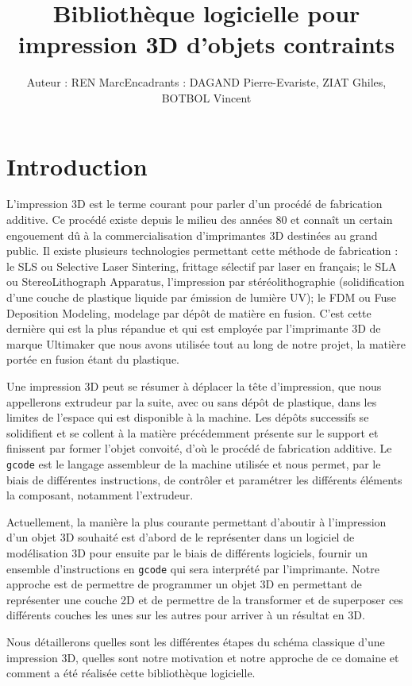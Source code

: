 \documentclass[11pt, titlepage]{article}
\author{Auteur : REN Marc\newline Encadrants : DAGAND Pierre-Evariste, ZIAT Ghiles, BOTBOL Vincent}
\title{Bibliothèque logicielle pour impression 3D d’objets contraints}
\begin{document}
\maketitle
\newpage
\newpage
\tableofcontents
\newpage
\section{Introduction}
L'impression 3D est le terme courant pour parler d'un procédé de fabrication additive. Ce procédé existe depuis le milieu des années 80 et connaît un certain engouement dû à la commercialisation d'imprimantes 3D destinées au grand public.
Il existe plusieurs technologies permettant cette méthode de fabrication :
le SLS ou Selective Laser Sintering, frittage sélectif par laser en français;
le SLA ou StereoLithograph Apparatus, l'impression par stéréolithographie (solidification d'une couche de plastique liquide par émission de lumière UV);
le FDM ou Fuse Deposition Modeling, modelage par dépôt de matière en fusion.
C'est cette dernière qui est la plus répandue et qui est employée par l'imprimante 3D de marque Ultimaker que nous avons utilisée tout au long de notre projet, la matière portée en fusion étant du plastique.

Une impression 3D peut se résumer à déplacer la tête d'impression, que nous appellerons extrudeur par la suite, avec ou sans dépôt de plastique, dans les limites de l'espace qui est disponible à la machine. Les dépôts successifs se solidifient et se collent à la matière précédemment présente sur le support et finissent par former l'objet convoité, d'où le procédé de fabrication additive. Le \verb&gcode& est le langage assembleur de la machine utilisée et nous permet, par le biais de différentes instructions, de contrôler et paramétrer les différents éléments la composant, notamment l'extrudeur.

Actuellement, la manière la plus courante permettant d'aboutir à l'impression d'un objet 3D souhaité est d'abord de le représenter dans un logiciel de modélisation 3D pour ensuite par le biais de différents logiciels, fournir un ensemble d'instructions en \verb&gcode& qui sera interprété par l'imprimante. Notre approche est de permettre de programmer un objet 3D en permettant de représenter une couche 2D et de permettre de la transformer et de superposer ces différents couches les unes sur les autres pour arriver à un résultat en 3D.

Nous détaillerons quelles sont les différentes étapes du schéma classique d'une impression 3D, quelles sont notre motivation et notre approche de ce domaine et comment a été réalisée cette bibliothèque logicielle.
\end{document}
